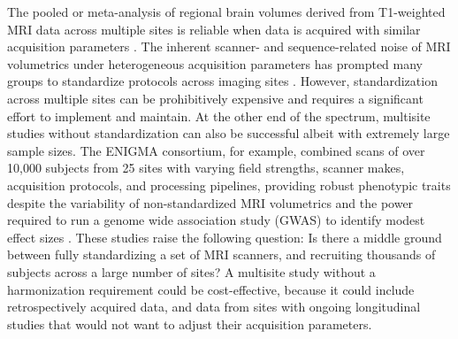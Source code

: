 The pooled  or meta-analysis of regional brain volumes derived from T1-weighted MRI data across multiple sites is reliable when data is acquired with similar acquisition parameters \cite{cannon2014,multicenter01,freesurferReliability}. The inherent scanner- and sequence-related noise of MRI volumetrics under heterogeneous acquisition parameters has prompted many groups to standardize protocols across imaging sites \cite{cannon2014,adniharmonize,ADNIReview}. However, standardization across multiple sites can be prohibitively expensive and requires a significant effort to implement and maintain. %
At the other end of the spectrum, multisite studies without standardization can also be successful albeit with extremely large sample sizes. The ENIGMA consortium, for example, combined scans of over 10,000 subjects from 25 sites with varying field strengths, scanner makes, acquisition protocols, and processing pipelines, providing robust phenotypic traits despite the variability of non-standardized MRI volumetrics and the power required to run a genome wide association study (GWAS) to identify modest effect sizes \cite{thompson2014enigma}. These studies raise the following question: Is there a middle ground between fully standardizing a set of MRI scanners, and recruiting thousands of subjects across a large number of sites? A multisite study without a harmonization requirement could be cost-effective, because it could include retrospectively acquired data, and data from sites with ongoing longitudinal studies that would not want to adjust their acquisition parameters.